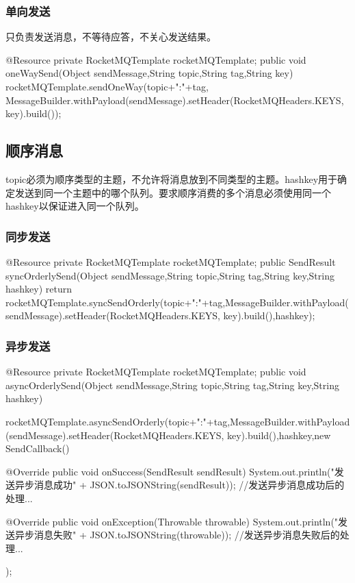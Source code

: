\documentclass[11pt, a4paper, oneside, fontset=none]{ctexbook}
\begin{document}
\subsubsection{单向发送}
只负责发送消息，不等待应答，不关心发送结果。
\begin{java}[caption=普通消息单向发送方式]
@Resource
private RocketMQTemplate rocketMQTemplate;
public void oneWaySend(Object sendMessage,String topic,String tag,String key) {
  rocketMQTemplate.sendOneWay(topic+":"+tag, MessageBuilder.withPayload(sendMessage).setHeader(RocketMQHeaders.KEYS, key).build());
}
\end{java}

\subsection{顺序消息}
topic必须为顺序类型的主题，不允许将消息放到不同类型的主题。hashkey用于确定发送到同一个主题中的哪个队列。要求顺序消费的多个消息必须使用同一个hashkey以保证进入同一个队列。
\subsubsection{同步发送}
\begin{java}[caption=顺序消息同步发送方式]
@Resource
private RocketMQTemplate rocketMQTemplate;
public SendResult syncOrderlySend(Object sendMessage,String topic,String tag,String key,String hashkey) {
  return rocketMQTemplate.syncSendOrderly(topic+":"+tag,MessageBuilder.withPayload(sendMessage).setHeader(RocketMQHeaders.KEYS, key).build(),hashkey);
}
\end{java}
\subsubsection{异步发送}
\begin{java}[caption=顺序消息异步发送方式]
@Resource
private RocketMQTemplate rocketMQTemplate;
public void asyncOrderlySend(Object sendMessage,String topic,String tag,String key,String hashkey) {
  rocketMQTemplate.asyncSendOrderly(topic+":"+tag,MessageBuilder.withPayload(sendMessage).setHeader(RocketMQHeaders.KEYS, key).build(),hashkey,new SendCallback() {
    @Override
    public void onSuccess(SendResult sendResult) {
      System.out.println("发送异步消息成功" + JSON.toJSONString(sendResult));
      //发送异步消息成功后的处理...
    }

    @Override
    public void onException(Throwable throwable) {
      System.out.println("发送异步消息失败" + JSON.toJSONString(throwable));
      //发送异步消息失败后的处理...
    }
  });
}
\end{java}
\end{document}
